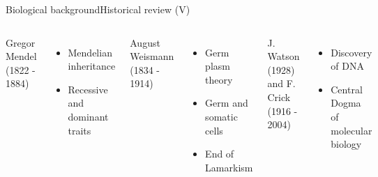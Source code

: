 \documentclass[10pt,compress]{beamer} %
\begin{document}
\begin{frame}{Biological background}{Historical review (V)}
 	\begin{columns}
		Gregor Mendel (1822 - 1884)
		\begin{itemize}
		\item Mendelian inheritance
		\item Recessive and dominant traits
		\end{itemize}


		August Weismann (1834 - 1914)
 	 	\begin{itemize}
		\item Germ plasm theory
		\item Germ and somatic cells
		\item End of Lamarkism
		\end{itemize}
		
		J. Watson (1928) and F. Crick (1916 - 2004)
 	 	\begin{itemize}
		\item Discovery of DNA
		\item Central Dogma of molecular biology
		\end{itemize}


\end{columns}
\end{frame}
\end{document}
